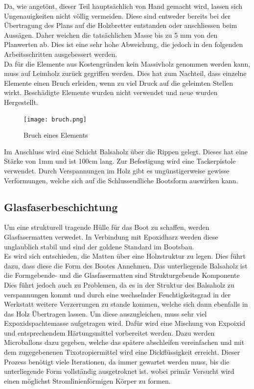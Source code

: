 Da, wie angetönt, dieser Teil hauptsächlich von Hand gemacht wird, lassen sich  Ungenauigkeiten nicht völlig vermeiden. Diese sind entweder bereits bei der Übertragung des Plans auf die Holzbretter entstanden oder anschliessen beim Aussägen. Daher weichen die tatsächlichen Masse bis zu 5 mm von den Planwerten ab. Dies ist eine sehr hohe Abweichung, die jedoch in den folgenden Arbeitsschritten ausgebessert werden. \\ 
Da für die Elemente aus Kostengründen kein Massivholz genommen werden kann, muss auf Leimholz zurück gegriffen werden. Dies hat zum Nachteil, dass einzelne Elemente einen Bruch erleiden, wenn zu viel Druck auf die geleimten Stellen wirkt. Beschädigte Elemente wurden nicht verwendet und neue wurden Hergestellt. 
\begin{figure}[H]
    \centering
    \texttt{[image: bruch.png]}
    \caption{Bruch eines Elements}
    \label{fig:bruch}
\end{figure}

Im Anschluss wird eine Schicht Balsaholz über die Rippen gelegt. Dieses hat eine Stärke von 1mm und ist 100cm lang. Zur Befestigung wird eine Tackerpistole verwendet. Durch Verspannungen im Holz gibt es ungünstigerweise gewisse Verformungen, welche sich auf die Schlussendliche Bootsform auswirken kann.

\subsection{Glasfaserbeschichtung}
Um eine strukturell tragende Hülle für das Boot zu schaffen, werden Glasfasermatten verwedet. In Verbindung mit Epoxidharz werden diese unglaublich stabil und sind der goldene Standard im Bootsbau. \\
Es wird sich entschieden, die Matten über eine Holzstruktur zu legen. Dies führt dazu, dass diese die Form des Bootes Annehmen. Das unterliegende Balsaholz ist die Formgebende- und die Glasfasermatten sind Strukturgebende Komponente \\
Dies führt jedoch auch zu Problemen, da es in der Struktur des Balsaholz zu verspannungen kommt und durch eine wechselnder Feuchtigkeitsgrad in der Werkstatt weitere Verzerrungen zu stande kommen, welche sich dann ebenfalls in das Holz Übertragen lassen. Um diese auszugleichen, muss sehr viel Expoxidspachtemasse aufgetragen wird. Dafür wird eine Mischung von Expoixid und entsprechendem Härtungsmittel vorbereitet werden. Dazu werden Microballons dazu gegeben, welche das spätere abschleifen vereinfachen und mit dem zugegebenenen Tixotropiermittel wird eine Dickflüssigkeit erreicht. Dieser Prozess benötigt viele Iterationen, da immer gewartet werden muss, bis die unterliegende Form vollständig ausgetroknet ist.  wobei primär Versucht wird einen möglichst Stromlinienförmigen Körper zu formen.

